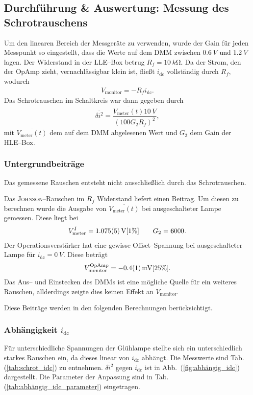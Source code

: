 \documentclass[sn-mathphys-num,iicol]{sn-jnl}
\theoremstyle{thmstyleone}
\theoremstyle{thmstyletwo}
\theoremstyle{thmstylethree}
\begin{document}
\subsection{Durchführung \& Auswertung: Messung des Schrotrauschens}
Um den linearen Bereich der Messgeräte zu verwenden, wurde der Gain für jeden Messpunkt so eingestellt, dass die Werte auf dem DMM zwischen $\SI{0.6}{V}$ und $\SI{1.2}{V}$ lagen.
Der Widerstand in der LLE--Box betrug $R_f=\SI{10}{k\ohm}$.
Da der Strom, den der OpAmp zieht, vernachlässigbar klein ist, fließt $i_\text{dc}$ vollständig durch $R_f$, wodurch
\begin{align}
	V_\text{monitor}=-R_fi_\text{dc}
	.\end{align}
Das Schrotrauschen im Schaltkreis war dann gegeben durch
\begin{align}
	\overline{\delta i^2}=\dfrac{\overline{V_\text{meter}(t)}\SI{10}{V}}{(100G_2R_f)^2}
	,\end{align}
mit $\overline{V_\text{meter}(t)}$ dem auf dem DMM abgelesenen Wert und $G_2$ dem Gain der HLE--Box.

\subsubsection{Untergrundbeiträge}
Das gemessene Rauschen entsteht nicht ausschließlich durch das Schrotrauschen.

Das \textsc{Johnson}--Rauschen im $R_f$ Widerstand liefert einen Beitrag.
Um diesen zu berechnen wurde die Ausgabe von $\overline{V_\text{meter}(t)}$ bei ausgeschalteter Lampe gemessen.
Diese liegt bei
\begin{align}
	V_\text{meter}^\text{J}=\SI{1.075+-0.005}{V}[1\%]\qquad G_2=6000
	.\end{align}
Der Operationsverstärker hat eine gewisse Offset--Spannung bei ausgeschalteter Lampe für $i_\text{dc}=\SI{0}{V}$.
Diese beträgt
\begin{align}
	V_\text{monitor}^\text{OpAmp}=\SI{-0.4+-0.1}{mV}[25\%] %
	.\end{align}
Das Aus-- und Einstecken des DMMs ist eine mögliche Quelle für ein weiteres Rauschen, allderdings zeigte dies keinen Effekt an $V_\text{monitor}$.

Diese Beiträge werden in den folgenden Berechnungen berücksichtigt.

\subsubsection{Abhängigkeit $i_\text{dc}$}
Für unterschiedliche Spannungen der Glühlampe stellte sich ein unterschiedlich starkes Rauschen ein, da dieses linear von $i_\text{dc}$ abhängt.
Die Messwerte sind Tab. (\ref{tab:schrot_idc}) zu entnehmen. $\overline{\delta i^2}$ gegen $i_\text{dc}$ ist in Abb.\ (\ref{fig:abhängig_idc}) dargestellt.  
Die Parameter der Anpassung sind in Tab. (\ref{tab:abhängig_idc_parameter}) eingetragen.
\end{document}
